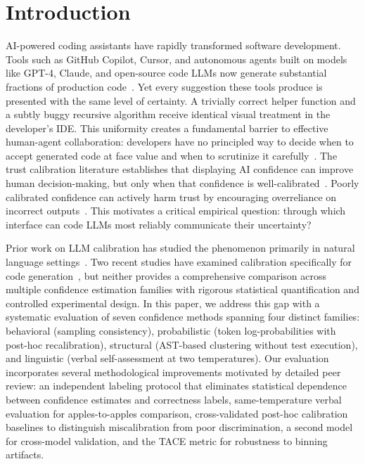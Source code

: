 \documentclass{article}
\begin{document}
\section{Introduction}
\label{sec:intro}

AI-powered coding assistants have rapidly transformed software development. Tools such as GitHub Copilot, Cursor, and autonomous agents built on models like GPT-4, Claude, and open-source code LLMs now generate substantial fractions of production code~\citep{peng2023impact}. Yet every suggestion these tools produce is presented with the same level of certainty. A trivially correct helper function and a subtly buggy recursive algorithm receive identical visual treatment in the developer's IDE. This uniformity creates a fundamental barrier to effective human-agent collaboration: developers have no principled way to decide when to accept generated code at face value and when to scrutinize it carefully~\citep{vaithilingam2022expectation, mozannar2024reading}. The trust calibration literature establishes that displaying AI confidence can improve human decision-making, but only when that confidence is well-calibrated~\citep{yin2019understanding, zhang2020effect}. Poorly calibrated confidence can actively harm trust by encouraging overreliance on incorrect outputs~\citep{rechkemmer2022confidence, bansal2021does}. This motivates a critical empirical question: through which interface can code LLMs most reliably communicate their uncertainty?

Prior work on LLM calibration has studied the phenomenon primarily in natural language settings~\citep{kadavath2022language, tian2023just, xiong2024can}. Two recent studies have examined calibration specifically for code generation~\citep{spiess2025calibration, campos2025multicalibration}, but neither provides a comprehensive comparison across multiple confidence estimation families with rigorous statistical quantification and controlled experimental design. In this paper, we address this gap with a systematic evaluation of seven confidence methods spanning four distinct families: behavioral (sampling consistency), probabilistic (token log-probabilities with post-hoc recalibration), structural (AST-based clustering without test execution), and linguistic (verbal self-assessment at two temperatures). Our evaluation incorporates several methodological improvements motivated by detailed peer review: an independent labeling protocol that eliminates statistical dependence between confidence estimates and correctness labels, same-temperature verbal evaluation for apples-to-apples comparison, cross-validated post-hoc calibration baselines to distinguish miscalibration from poor discrimination, a second model for cross-model validation, and the TACE metric for robustness to binning artifacts.
\end{document}
